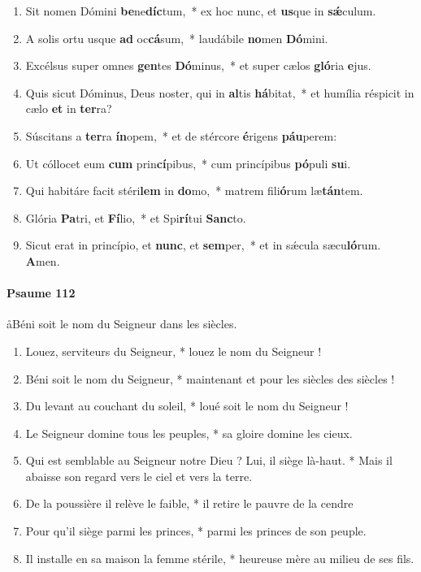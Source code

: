 \documentclass[twoside]{article}
\begin{document}
\begin{paracol}[1]{2}
\begin{enumerate}[wide, itemsep=0mm, labelwidth=!, labelindent=0pt, label=\color{gregoriocolor}\theenumi]
\item {} Sit nomen Dómini \textbf{be}ne\textbf{díc}tum,~* ex hoc nunc, et \textbf{us}que in \textbf{sǽ}culum.
\newpage
\item A solis ortu usque \textbf{ad} oc\textbf{cá}sum,~* laudábile \textbf{no}men \textbf{Dó}mini.
\item Excélsus super omnes \textbf{gen}tes \textbf{Dó}minus,~* et super cælos \textbf{gló}ria \textbf{e}jus.
\item Quis sicut Dóminus, Deus noster, qui in \textbf{al}tis \textbf{há}bitat,~* et humília réspicit in cælo \textbf{et} in \textbf{ter}ra?
\item Súscitans a \textbf{ter}ra \textbf{ín}opem,~* et de stércore \textbf{é}rigens \textbf{páu}perem:
\item Ut cóllocet eum \textbf{cum} prin\textbf{cí}pibus,~* cum princípibus \textbf{pó}puli \textbf{su}i.
\item Qui habitáre facit stéri\textbf{lem} in \textbf{do}mo,~* matrem fili\textbf{ó}rum læ\textbf{tán}tem.
\item Glória \textbf{Pa}tri, et \textbf{Fí}lio,~* et Spi\textbf{rí}tui \textbf{Sanc}to.
\item Sicut erat in princípio, et \textbf{nunc}, et \textbf{sem}per,~* et in sǽcula sæcu\textbf{ló}rum. \textbf{A}men.
\end{enumerate}

\switchcolumn

\paragraph{Psaume 112}

\aa Béni soit le nom du Seigneur dans les siècles.


\begin{enumerate}[wide, itemsep=0mm, labelwidth=!, labelindent=0pt, label=\color{gregoriocolor}\theenumi]

\item Louez, serviteurs du Seigneur, *
louez le nom du Seigneur !
\item {} Béni soit le nom du Seigneur, *
maintenant et pour les siècles des siècles !
\item Du levant au couchant du soleil, *
loué soit le nom du Seigneur !
\item Le Seigneur domine tous les peuples, *
sa gloire domine les cieux.
\item Qui est semblable au Seigneur notre Dieu ? Lui, il siège là-haut. *
Mais il abaisse son regard vers le ciel et vers la terre.
\item De la poussière il relève le faible, *
il retire le pauvre de la cendre
\item Pour qu'il siège parmi les princes, *
parmi les princes de son peuple.
\item Il installe en sa maison la femme stérile, *
heureuse mère au milieu de ses fils.
\end{enumerate}


\end{paracol}
\end{document}
